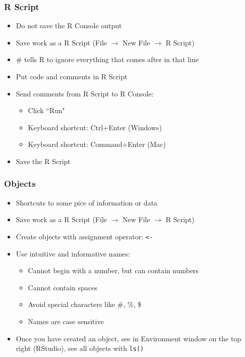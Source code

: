 \documentclass{beamer}
\begin{document}
\begin{frame}
 \frametitle<+->{R Script}
 \begin{itemize}
   \item Do not save the R Console output
   \item Save work as a R Script (File $\rightarrow$ New File $\rightarrow$ R Script)
   \item \# tells R to ignore everything that comes after in that line
   \item Put code and comments in R Script
   \item Send comments from R Script to R Console:
     \begin{itemize}
       \item Click ``Run"
       \item Keyboard shortcut: Ctrl+Enter (Windows)
       \item Keyboard shortcut: Command+Enter (Mac)
     \end{itemize}
   \item Save the R Script
 \end{itemize}
\end{frame}

\begin{frame}
 \frametitle<+->{Objects}
 \begin{itemize}
   \item Shortcuts to some pice of information or data
   \item Save work as a R Script (File $\rightarrow$ New File $\rightarrow$ R Script)
   \item Create objects with assignment operator: {\tt <-}
   \item Use intuitive and informative names:
     \begin{itemize}
       \item Cannot begin with a number, but can contain numbers
       \item Cannot contain spaces
       \item Avoid special characters like \#, \%, \$
       \item Names are case sensitive
     \end{itemize}
   \item Once you have created an object, see in Environment window on the top right (RStudio), see all objects with {\tt ls()}
 \end{itemize}
\end{frame}
\end{document}

